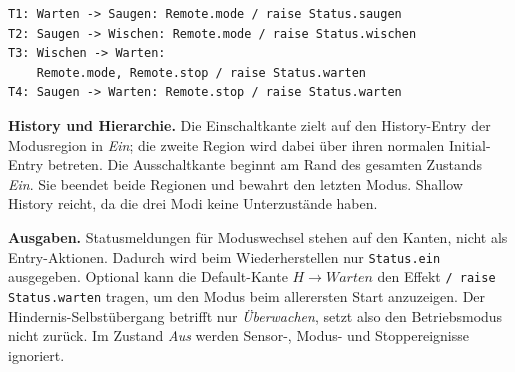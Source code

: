 \begin{lstlisting}
T1: Warten -> Saugen: Remote.mode / raise Status.saugen
T2: Saugen -> Wischen: Remote.mode / raise Status.wischen
T3: Wischen -> Warten:
    Remote.mode, Remote.stop / raise Status.warten
T4: Saugen -> Warten: Remote.stop / raise Status.warten
\end{lstlisting}
\textbf{History und Hierarchie.} Die Einschaltkante zielt auf den History-Entry der Modusregion in \textit{Ein}; die zweite Region wird dabei über ihren normalen Initial-Entry betreten. Die Ausschaltkante beginnt am Rand des gesamten Zustands \textit{Ein}. Sie beendet beide Regionen und bewahrt den letzten Modus. Shallow History reicht, da die drei Modi keine Unterzustände haben.

\textbf{Ausgaben.} Statusmeldungen für Moduswechsel stehen auf den Kanten, nicht als Entry-Aktionen. Dadurch wird beim Wiederherstellen nur \texttt{Status.ein} ausgegeben. Optional kann die Default-Kante $H\to Warten$ den Effekt \texttt{/ raise Status.warten} tragen, um den Modus beim allerersten Start anzuzeigen. Der Hindernis-Selbstübergang betrifft nur \textit{Überwachen}, setzt also den Betriebsmodus nicht zurück. Im Zustand \textit{Aus} werden Sensor-, Modus- und Stoppereignisse ignoriert.
\newpage
